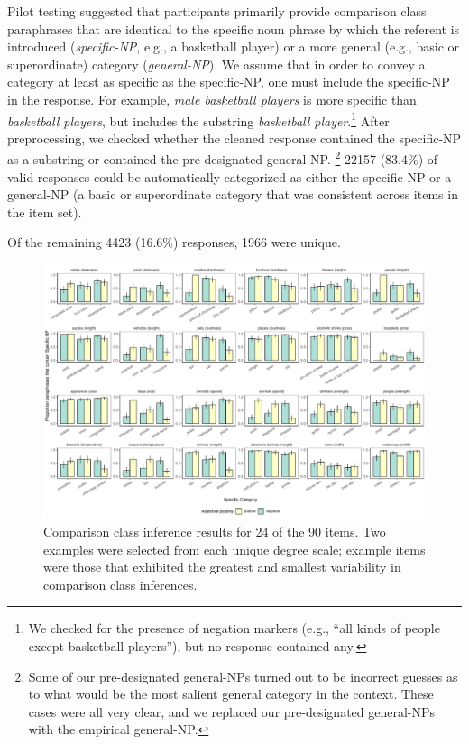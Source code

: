 \documentclass[doc]{apa6}
\begin{document}
Pilot testing suggested that participants primarily provide comparison class paraphrases that are identical to the specific noun phrase by which the referent is introduced (\emph{specific-NP}, e.g., a basketball player) or a more general (e.g., basic or superordinate) category (\emph{general-NP}). 
We assume that in order to convey a category at least as specific as the specific-NP, one must include the specific-NP in the response. 
For example, \emph{male basketball players} is more specific than \emph{basketball players}, but includes the substring \emph{basketball player}.\footnote{We checked for the presence of negation markers (e.g., ``all kinds of people except basketball players''), but no response contained any.}
After preprocessing, we checked whether the cleaned response contained the specific-NP as a substring or contained the pre-designated general-NP. \footnote{Some of our pre-designated general-NPs turned out to be incorrect guesses as to what would be the most salient general category in the context. These cases were all very clear, and we replaced our pre-designated general-NPs with the empirical general-NP.}
22157 (83.4\%) of valid responses could be automatically categorized as either the specific-NP or a general-NP (a basic or superordinate category that was consistent across items in the item set). 

Of the remaining 4423 (16.6\%) responses, 1966 were unique. 

\begin{figure}[t!]
\centering
\includegraphics[width=\textwidth]{figs/bars_cc_finalExpt_prereg_byItem.pdf}
\caption{Comparison class inference results for 24 of the 90 items. Two examples were selected from each unique degree scale; example items were those that exhibited the greatest and smallest variability in comparison class inferences.}\label{fig:ccInferenceItems}
\end{figure}
\end{document}
